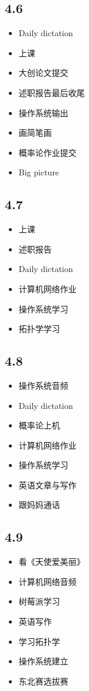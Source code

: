 \documentclass[UTF8]{ctexart}
\begin{document}
\subsection*{4.6}
\begin{itemize}
    \item Daily dictation
    \item 上课
    \item 大创论文提交
    \item 述职报告最后收尾
    \item 操作系统输出
    \item 画简笔画
    \item 概率论作业提交
    \item Big picture
\end{itemize}
\subsection*{4.7}
\begin{itemize}
    \item 上课
    \item 述职报告
    \item Daily dictation
    \item 计算机网络作业
    \item 操作系统学习
    \item 拓扑学学习
\end{itemize}
\subsection*{4.8}
\begin{itemize}
    \item 操作系统音频
    \item Daily dictation
    \item 概率论上机
    \item 计算机网络作业
    \item 操作系统学习
    \item 英语文章与写作
    \item 跟妈妈通话
\end{itemize}
\subsection*{4.9}
\begin{itemize}
    \item 看《天使爱美丽》
    \item 计算机网络音频
    \item 树莓派学习
    \item 英语写作
    \item 学习拓扑学
    \item 操作系统建立
    \item 东北赛选拔赛
\end{itemize}
\end{document}
